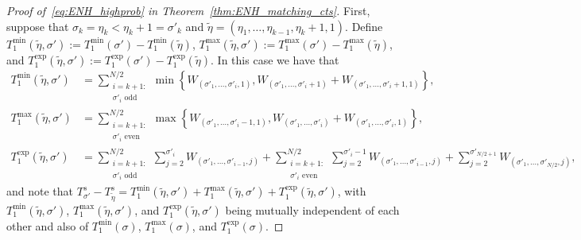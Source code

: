 \documentclass[11pt]{article}
\numberwithin{equation}{section}
\newcommand{\wt}{\widetilde} %
\theoremstyle{definition}
\begin{document}
\begin{proof}[Proof of~\eqref{eq:ENH_highprob} in Theorem~\ref{thm:ENH_matching_cts}]
First, suppose that 
$\sigma_{k} = \eta_{k} < \eta_{k} + 1 = \sigma'_{k}$ 
and 
$\wt{\eta} = (\eta_{1}, \ldots, \eta_{k-1}, \eta_{k} + 1, 1)$. 
Define 
$T_{1}^{\min} \left( \wt{\eta}, \sigma' \right) := T_{1}^{\min} \left( \sigma' \right) - T_{1}^{\min} \left( \wt{\eta} \right)$, 
$T_{1}^{\max} \left( \wt{\eta}, \sigma' \right) := T_{1}^{\max} \left( \sigma' \right) - T_{1}^{\max} \left( \wt{\eta} \right)$, 
and 
$T_{1}^{\exp} \left( \wt{\eta}, \sigma' \right) := T_{1}^{\exp} \left( \sigma' \right) - T_{1}^{\exp} \left( \wt{\eta} \right)$. 
In this case we have that 
\begin{align*}
    T_{1}^{\min}(\wt{\eta}, \sigma') 
    &=  
    \sum_{\substack{i=k+1: \\ \sigma'_{i} \text{ odd}}}^{N/2} \min \left\{ W_{(\sigma'_1,\ldots,\sigma'_i,1)} , W_{(\sigma'_1,\ldots,\sigma'_i + 1 )} + W_{(\sigma'_1,\ldots,\sigma'_i + 1, 1)} \right\}, \\
    T_{1}^{\max}(\wt{\eta}, \sigma')
    &=
    \sum_{\substack{i=k+1: \\ \sigma'_{i} \text{ even}}}^{N/2} \max \left\{ W_{(\sigma'_1,\ldots,\sigma'_{i}-1,1)} , W_{(\sigma'_1,\ldots,\sigma'_i  )} + W_{(\sigma'_1,\ldots,\sigma'_i, 1)} \right\}, \\
    T_{1}^{\exp}(\wt{\eta}, \sigma')
    &=
    \sum_{\substack{i=k+1: \\ \sigma'_{i} \text{ odd}}}^{N/2} \sum_{j=2}^{\sigma'_i} W_{(\sigma'_1,\ldots,\sigma'_{i-1},j)}
    +
    \sum_{\substack{i=k+1: \\ \sigma'_{i} \text{ even}}}^{N/2} \sum_{j=2}^{\sigma'_i-1} W_{(\sigma'_1,\ldots,\sigma'_{i-1},j)}
    +
    \sum_{j=2}^{\sigma'_{N/2+1}} W_{(\sigma'_1,\ldots,\sigma'_{N/2},j)}, 
\end{align*}
and note that 
$T_{\sigma'}^{s} - T_{\wt{\eta}}^{s} 
= T_{1}^{\min} \left( \wt{\eta}, \sigma' \right) + T_{1}^{\max} \left( \wt{\eta}, \sigma' \right) + T_{1}^{\exp} \left( \wt{\eta}, \sigma' \right)$, 
with 
$T_{1}^{\min} \left( \wt{\eta}, \sigma' \right)$, 
$T_{1}^{\max} \left( \wt{\eta}, \sigma' \right)$, 
and 
$T_{1}^{\exp} \left( \wt{\eta}, \sigma' \right)$ 
being mutually independent of each other 
and also of 
$T_{1}^{\min} \left( \sigma \right)$, 
$T_{1}^{\max} \left( \sigma \right)$, 
and 
$T_{1}^{\exp} \left( \sigma \right)$.  


\end{proof}
\end{document}
